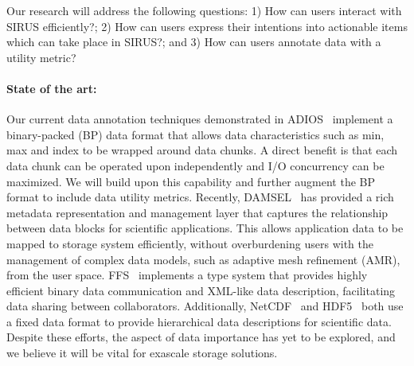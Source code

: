 




Our research will address the following questions:
1) How can users interact with SIRUS  efficiently?;
2) How can users express their intentions into actionable items which can take place in SIRUS?; and
3) How can users annotate data with a utility metric?

\paragraph{State of the art:}
Our current data annotation techniques demonstrated in
ADIOS~\cite{lofstead:2009:adaptible} implement a binary-packed (BP) data format that
allows data characteristics such as min, max and index to be wrapped around
data chunks. A direct benefit is that each data chunk can be operated upon
independently and I/O concurrency can be maximized. We will build upon this
capability and further augment the BP format to include data utility metrics.
Recently,
DAMSEL~\cite{damsel} has provided a rich metadata representation and management
layer that captures the relationship between data blocks for scientific
applications.  This allows application data to be mapped to storage system
efficiently, without overburdening users with the management of complex data models, such
as adaptive mesh refinement (AMR), from the user space. 
FFS~\cite{ffs} implements a type system that provides highly efficient binary
data communication and XML-like data description, facilitating data sharing
between collaborators. Additionally, NetCDF~\cite{netcdf} and HDF5~\cite{hdf5}
both use a fixed data format to provide hierarchical data descriptions for scientific data.
Despite these efforts, the aspect of data importance has yet to be 
explored, and we believe it will be vital for exascale storage solutions.

